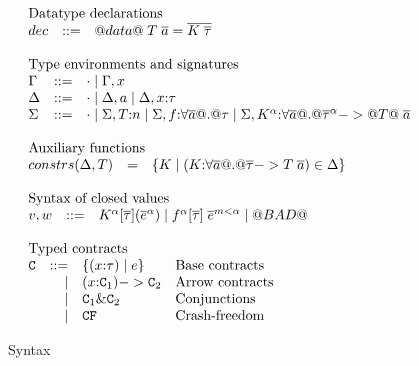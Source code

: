 \documentclass[preprint,nocopyrightspace,draft]{sigplanconf}
\begin{document}
\begin{figure}
\[\begin{array}{l}
\begin{array}{lrll}
\multicolumn{3}{l}{\text{Datatype declarations}} \\
dec & ::= & @data@\;T\;\ol{a} = \ol{K\;\taus}
\end{array}\\ \\ 
\begin{array}{lrll}
\multicolumn{3}{l}{\text{Type environments and signatures}} \\
\Gamma & ::=  & \cdot \mid \Gamma,x \\
\Delta & ::=  & \cdot \mid \Delta,a \mid \Delta,x{:}\tau \\
\Sigma & ::=  & \cdot \mid \Sigma,T{:}n \mid \Sigma,f{:}\forall\ol{a} @.@ \tau \mid \Sigma,K^{\ar}{:}\forall\ol{a} @.@ \oln{\tau}{\ar} -> @T@\;\as
\end{array}\\ \\
\begin{array}{lrll}
\multicolumn{3}{l}{\text{Auxiliary functions}} \\
constrs(\Delta,T) & = & \{ K \mid (K{:}\forall \as @.@ \taus -> T\;\as) \in \Delta \} \\
\end{array}\\ \\ 
\begin{array}{lrll}
\multicolumn{3}{l}{\text{Syntax of closed values}} \\
 v,w & ::= & K^\ar[\ol{\tau}](\oln{e}{\ar}) \mid f^\ar[\ol{\tau}]\;\oln{e}{m < \ar} \mid @BAD@ \\ \\ 
\end{array} \\
\begin{array}{lrll}
\multicolumn{3}{l}{\text{Typed contracts}} \\
\Ct & ::=  & \{ (x{:}\tau) \mid e \}    & \text{Base contracts} \\ 
  & \mid &  (x{:}\Ct_1) -> \Ct_2        & \text{Arrow contracts} \\ 
  & \mid & \Ct_1 \& \Ct_2               & \text{Conjunctions}    \\ 
  & \mid & \CF                          & \text{Crash-freedom}  \\
\end{array} \\
\end{array}\]
\caption{Syntax}\label{fig:syntax}
\end{figure}
\end{document}
